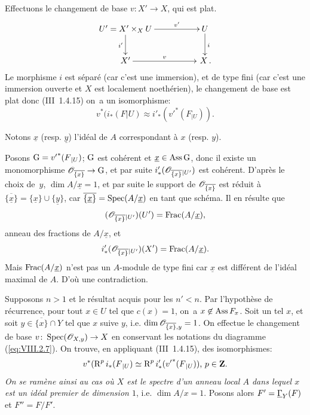 \setcounter{equation}{6}

Effectuons le changement de base $v\colon X'\to X$, qui est plat.
\begin{equation} \label{eq:VIII.2.7}
\begin{array}{c}
\xymatrix@C=5em{ U'=X'\times_X U\ar[r]^-{v'}\ar[d]_{i'} & U\ar[d]^i \\
X'\ar[r]^-v & \,X\,.
}
\end{array}
\end{equation}
Le morphisme $i$ est s\'epar\'e (car c'est une immersion), et de type fini (car c'est une immersion ouverte et $X$ est localement noeth\'erien), le changement de base est plat donc (\EGA III~1.4.15) on~a un isomorphisme:
\begin{equation} \label{eq:VIII.2.8}
v^\ast(i_\ast(F|U) \approx i'_\ast({v'}^\ast(F_{|U})).
\end{equation}

Notons $\underline x$ (resp. $\underline y$) l'id\'eal de $A$ correspondant \`a $x$ (resp. $y$).

Posons ${\operatorname{G}}={v'}^\ast(F{}_{|U})$; ${\operatorname{G}}$ est coh\'erent et $\underline{x}\in\operatorname{Ass} {\operatorname{G}}$, donc il existe un monomorphisme $\Oo_{\overline{\{x\}}}\to {\Ga}$, et par suite $i'_\ast({\mathscr O}_{\overline{\{x\}}}{}_{|U'})$ est coh\'erent. D'apr\`es le choix de~$y$, $\dim A/\underline x=1$, et par suite le support de ${\mathscr O}_{\overline{\{x\}}}$ est r\'eduit \`a $\overline{\{\underline x\}}= \{\underline x\}\cup \{\underline y\}$, car $\overline{\{\underline x\}}= \operatorname{Spec}(A/\underline x)$ en tant que sch\'ema. Il en r\'esulte que
\[({\mathscr O}_{\overline{\{x\}}}{}_{|U'})(U')=\operatorname{Frac} (A/\underline x), \]
anneau des fractions de $A/\underline x$, et
\[i'_\ast({\mathscr O}_{\overline{\{x\}}}{}_{|U'})(X')=\operatorname{Frac}(A/\underline x).
\]
Mais $\operatorname{Frac}(A/\underline x)$ n'est pas un $A$-module de type fini car $\underline x$ est diff\'erent de l'id\'eal maximal de $A$. D'o\`u une contradiction.

Supposons $n>1$ et le r\'esultat acquis pour les $n'<n$. Par l'hypoth\`ese de r\'ecurrence, pour tout $x\in U$ tel que $c(x)=1$, on~a $x\not\in\operatorname{Ass} F_x$. Soit un tel $x$, et soit $y\in\overline{\{x\}}\cap Y$ tel que $x$ suive $y$, i.e. $\dim{\mathscr O}_{\overline{\{x\}}, y}=1$. On effectue le changement de base $v\colon\Spec (\Oo_{X, y})\to X$ en conservant les notations du diagramme (\ref{eq:VIII.2.7}). On trouve, en appliquant (\EGA III~1.4.15), des isomorphismes:
\[v^\ast(\operatorname{R}^pi_\ast(F{}_{|U}) \simeq \operatorname{R}^pi'_\ast({v'}^\ast(F{}_{|U}))\text{, }p\in\mathbf{Z}.
\]
\emph{On se ramène ainsi au cas où $X$ est le spectre d'un anneau local $A$ dans lequel $x$ est un idéal premier de dimension $1$}, i.e. $\dim A/x=1$. Posons alors $F'=\underline{\Gamma}_Y(F)$ et $F''=F/F'$.

